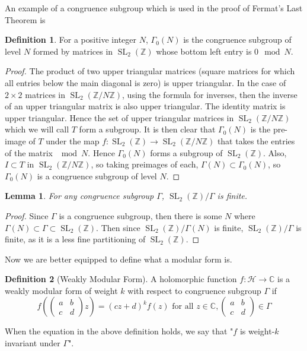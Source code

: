 \documentclass{article}
\newtheorem{lemma}[theorem]{Lemma}
\theoremstyle{definition}
\newtheorem{definition}{Definition}[section]
\theoremstyle{definition}
\theoremstyle{definition}
\newcommand{\SLZ}{\operatorname{SL}_2(\mathbb{Z})}
\newcommand{\Mabcd}{\begin{pmatrix} a&b\\c&d \end{pmatrix}}
\begin{document}
An example of a congruence subgroup which is used in the proof of Fermat's Last Theorem is
\begin{definition}
    For a positive integer $N$, $\Gamma_0(N)$ is the congruence subgroup of level $N$ formed by matrices in $\SLZ$ whose bottom left entry is $0\mod N$.
\end{definition}
\begin{proof}
    The product of two upper triangular matrices (square matrices for which all entries below the main diagonal is zero) is upper triangular. In the case of $2\times 2$ matrices in $\operatorname{SL}_2(\mathbb Z/N\mathbb Z)$, using the formula for inverses, then the inverse of an upper triangular matrix is also upper triangular. The identity matrix is upper triangular. Hence the set of upper triangular matrices in $\operatorname{SL}_2(\mathbb{Z}/N\mathbb Z)$ which we will call $T$ form a subgroup. It is then clear that $\Gamma_0(N)$ is the pre-image of $T$ under the map $f:\SLZ\rightarrow \operatorname{SL}_2(\mathbb{Z}/N\mathbb Z)$ that takes the entries of the matrix $\mod N$. Hence $\Gamma_0(N)$ forms a subgroup of $\SLZ$. Also, ${I}\subset T$ in $\operatorname{SL}_2(\mathbb Z/N\mathbb Z)$, so taking preimages of each, $\Gamma(N)\subset\Gamma_0(N)$, so $\Gamma_0(N)$ is a congruence subgroup of level $N$.
\end{proof}

\begin{lemma}
    For any congruence subgroup $\Gamma$, $\SLZ/\Gamma$ is finite.
\end{lemma}
\begin{proof}
    Since $\Gamma$ is a congruence subgroup, then there is some $N$ where $\Gamma(N)\subset\Gamma\subset\SLZ$. Then since $\SLZ/\Gamma(N)$ is finite, $\SLZ/\Gamma$ is finite, as it is a less fine partitioning of $\SLZ$.
\end{proof}


Now we are better equipped to define what a modular form is.

\begin{definition} [Weakly Modular Form]

A holomorphic function $f:\mathcal{H}\rightarrow\mathbb{C}$ is a weakly modular form of weight $k$ with respect to congruence subgroup $\Gamma$ if
$$f\left(\Mabcd z\right)=(cz+d)^kf(z)\text{ for all }z\in \mathbb{C}, \Mabcd\in\Gamma$$
\end{definition}

When the equation in the above definition holds, we say that "$f$ is weight-$k$ invariant under $\Gamma$".
\end{document}

